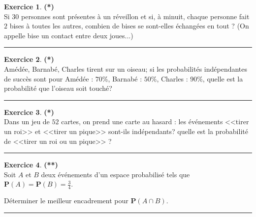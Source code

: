 \documentclass[a4paper,11pt]{article}
\theoremstyle{definition}
\newtheorem{exo}{Exercice} %
\begin{document}
\begin{minipage}{1\linewidth}\begin{minipage}[c]{0.48\linewidth}\raggedright
	
\begin{exo}\textbf{(*)}\quad\\[0.1cm]
Si $30$ personnes sont présentes à un réveillon et si, à minuit, chaque personne fait $2$ bises à toutes les autres, combien de bises se sont-elles échangées en tout ? (On appelle bise un contact entre deux joues...)

	
\centering\rule{1\linewidth}{0.6pt}\end{exo}



\begin{exo}\textbf{(*)}\quad\\[0.1cm]
	Amédée, Barnabé, Charles tirent sur un oiseau; si les
	probabilités indépendantes de succès sont pour Amédée : $70$\%, Barnabé : $50$\%, Charles : $90$\%, quelle est la probabilité que l'oiseau soit
	touché?

	\centering\rule{1\linewidth}{0.6pt}\end{exo}

\begin{exo}\textbf{(*)}\quad\\[0.1cm]
	Dans un jeu de $52$ cartes, on prend une carte au hasard : les événements <<tirer un roi>> et 
	<<tirer un pique>> sont-ils indépendants? quelle est la probabilité de <<tirer un roi ou
	un pique>> ? 
	
	\centering\rule{1\linewidth}{0.6pt}\end{exo}

		\begin{exo}\textbf{(**)}\quad\\[0.1cm]
	Soit $A$ et $B$ deux événements d'un espace probabilisé tels que $\mathbf{P}(A)=\mathbf{P}(B)=\frac{3}{4}$. 
	
	Déterminer le meilleur encadrement pour $\mathbf{P}(A \cap B)$.
	
	
	\centering\rule{1\linewidth}{0.6pt}\end{exo}




\end{minipage}\hfill\vrule\hfill\begin{minipage}[c]{0.48\linewidth}\raggedright


\end{minipage}
\end{minipage}
\end{document}
